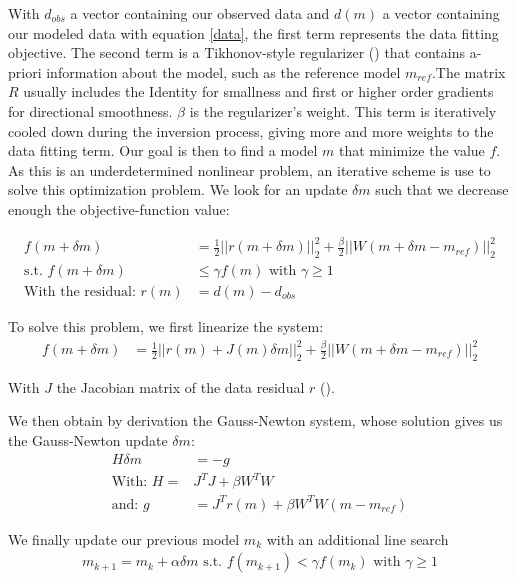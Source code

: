 \documentclass[twoside]{article}
\begin{document}
With $d_{obs}$ a vector containing our observed data and $d(m)$ a vector containing our modeled data with equation \ref{data}, the first term represents the data fitting objective. The second term is a Tikhonov-style regularizer (\cite{Tik:1977}) that contains a-priori information about the model, such as the reference model $m_{ref}$.The matrix $R$ usually includes the Identity for smallness and first or higher order gradients for directional smoothness. $\beta$ is the regularizer's weight. This term is iteratively cooled down during the inversion process, giving more and more weights to the data fitting term. Our goal is then to find a model $m$ that minimize the value $f$. As this is an underdetermined nonlinear problem, an iterative scheme is use to solve this optimization problem. We look for an update $\delta m$ such that we decrease enough the objective-function value:

\begin{align}
f(m+\delta m) &= \frac{1}{2} ||r(m+ \delta m)||_2^2 + \frac{\beta }{2} ||W(m+ \delta m-m_{ref})||_2^2 \label{LinearizedObjFunc}\\
\text{s.t. } f(m+\delta m) & \leq \gamma f(m) \text{ with } \gamma \geq 1 \\
\text{With the residual: }  r(m) &= d(m)-d_{obs}
\end{align}

To solve this problem, we first linearize the system:
\begin{align}
f(m+\delta m) &= \frac{1}{2} ||r(m)+J(m)\delta m||_2^2 + \frac{\beta }{2} ||W(m+\delta m-m_{ref})||_2^2 \label{linearized_DCproblem}
\end{align}

With $J$ the Jacobian matrix of the data residual $r$ (\cite{Haber:2014}).

We then obtain by derivation the Gauss-Newton system, whose solution gives us the Gauss-Newton update $\delta m$: 
\begin{align}
H \delta m &= -g \\
\text{With: } H = &J^TJ+\beta W^TW \\
\text{and: } g &= J^Tr(m) + \beta W^TW(m-m_{ref})
\end{align}

We finally update our previous model $m_k$ with an additional line search
\begin{align}
m_{k+1} = m_k+\alpha \delta m \text{ s.t. } f(m_{k+1}) < \gamma f(m_{k}) \text{ with } \gamma \geq 1
\end{align}
\end{document}
